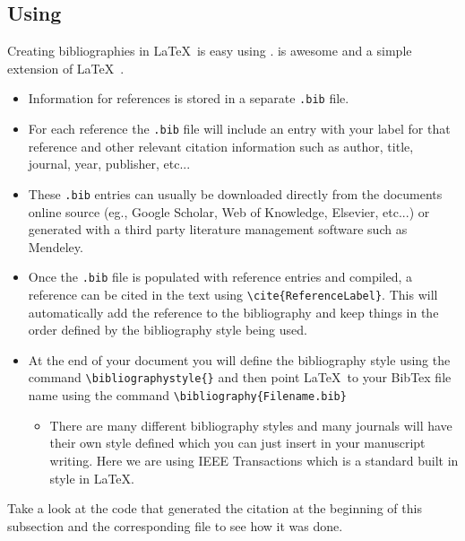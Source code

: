 \documentclass[]{article}%
\newcommand{\bs}{\textbackslash}
\newcommand{\TT}[1]{\texttt{#1}}
\newcommand{\tpc}{\textperiodcentered}
\theoremstyle{definition}
\begin{document}
	\subsection{Using }
	Creating bibliographies in \LaTeX\ is easy using .
	 is awesome and a simple extension of \LaTeX\ \cite{MyRef0}.
	
	\begin{itemize}
		\item Information for references is stored in a separate \TT{.bib} file.
		\item For each reference the \TT{.bib} file will include an entry with your label for that reference and other relevant citation information such as author, title, journal, year, publisher, etc...
		\item These \TT{.bib} entries can usually be downloaded directly from the documents online source (eg., Google Scholar, Web of Knowledge, Elsevier, etc...) or generated with a third party literature management software such as Mendeley.
		\item Once the \TT{.bib} file is populated with reference entries and compiled, a reference can be cited in the text using \TT{\bs cite\{ReferenceLabel\}}.
		This will automatically add the reference to the bibliography and keep things in the order defined by the bibliography style being used.
		\item At the end of your document you will define the bibliography style using the command \TT{\bs bibliographystyle\{\tpc\}} and then point \LaTeX\ to your BibTex file name using the command \TT{\bs bibliography\{Filename.bib\}}
		\begin{itemize}
			\item There are many different bibliography styles and many journals will have their own style defined which you can just insert in your manuscript writing.
			Here we are using IEEE Transactions which is a standard built in style in \LaTeX.
		\end{itemize}
	\end{itemize}
	Take a look at the code that generated the citation at the beginning of this subsection and the corresponding  file to see how it was done.
	
\end{document}
